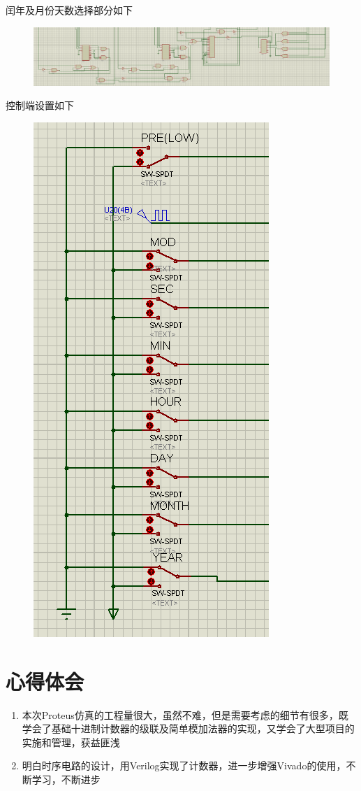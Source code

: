 \documentclass[11pt,UTF8]{ctexart}
\begin{document}
\par 闰年及月份天数选择部分如下
\begin{figure}[H]
    \centering
    \includegraphics[width=\linewidth]{fig/Counter_4_2.PNG}
\end{figure}
\par 控制端设置如下
\begin{figure}[H]
    \centering
    \includegraphics[width=0.3\linewidth]{fig/Counter_3_button.PNG}
\end{figure}


\section{心得体会}
\begin{enumerate}
    \item 本次Proteus仿真的工程量很大，虽然不难，但是需要考虑的细节有很多，既学会了基础十进制计数器的级联及简单模加法器的实现，又学会了大型项目的实施和管理，获益匪浅
    \item 明白时序电路的设计，用Verilog实现了计数器，进一步增强Vivado的使用，不断学习，不断进步
\end{enumerate}
\end{document}
